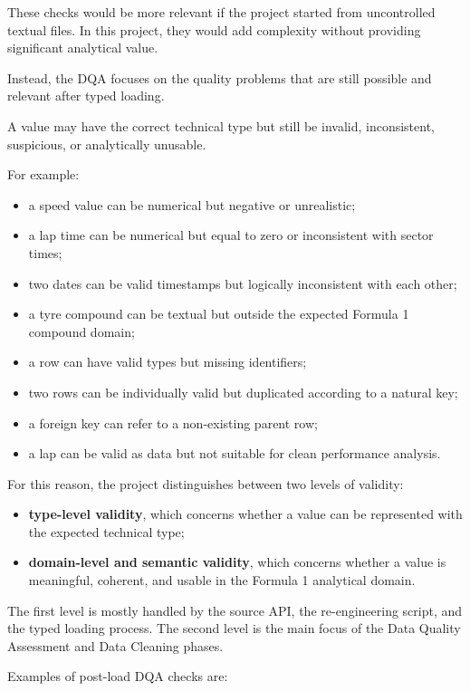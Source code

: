\documentclass[a4paper,11pt]{article}
\begin{document}
	These checks would be more relevant if the project started from uncontrolled textual files.
	In this project, they would add complexity without providing significant analytical value.
	
	Instead, the DQA focuses on the quality problems that are still possible and relevant after typed loading.
	
	A value may have the correct technical type but still be invalid, inconsistent, suspicious, or analytically unusable.
	
	For example:
	
	\begin{itemize}
		\item a speed value can be numerical but negative or unrealistic;
		\item a lap time can be numerical but equal to zero or inconsistent with sector times;
		\item two dates can be valid timestamps but logically inconsistent with each other;
		\item a tyre compound can be textual but outside the expected Formula 1 compound domain;
		\item a row can have valid types but missing identifiers;
		\item two rows can be individually valid but duplicated according to a natural key;
		\item a foreign key can refer to a non-existing parent row;
		\item a lap can be valid as data but not suitable for clean performance analysis.
	\end{itemize}
	
	For this reason, the project distinguishes between two levels of validity:
	
	\begin{itemize}
		\item \textbf{type-level validity}, which concerns whether a value can be represented with the expected technical type;
		\item \textbf{domain-level and semantic validity}, which concerns whether a value is meaningful, coherent, and usable in the Formula 1 analytical domain.
	\end{itemize}
	
	The first level is mostly handled by the source API, the re-engineering script, and the typed loading process.
	The second level is the main focus of the Data Quality Assessment and Data Cleaning phases.
	
	Examples of post-load DQA checks are:
	
\end{document}
